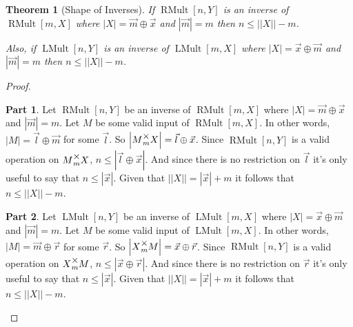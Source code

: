 \documentclass[12pt]{book}
\theoremstyle{plain}
\newtheorem{theorem}{Theorem}[chapter]
\theoremstyle{definition}
\theoremstyle{ppart}
\newtheorem{ppart}{Part}
\theoremstyle{case}
\theoremstyle{solution}
\DeclareMathOperator{\RMult}{RMult}
\DeclareMathOperator{\LMult}{LMult}
\newcommand{\mmult}[1]{\text{\raisebox{1ex}{$\underset{#1}{\times}$}}}
\newcommand{\shape}[1]{\left|#1\right|}
\begin{document}
\begin{theorem}[Shape of Inverses]
\label{inverse_shape}
If $\RMult[n,Y]$ is an inverse of $\RMult[m,X]$ where $\shape{X} = \vec{m} \oplus \vec{x}$ and
$\shape{\vec{m}} = m$ then $n \le \shape{\shape{X}}-m$.

Also, if $\LMult[n,Y]$ is an inverse of $\LMult[m,X]$ where $\shape{X} = \vec{x} \oplus \vec{m}$ and
$\shape{\vec{m}} = m$ then $n \le \shape{\shape{X}}-m$.
\end{theorem}
\begin{proof}
\begin{ppart}
Let $\RMult[n,Y]$ be an inverse of $\RMult[m,X]$ where $\shape{X} = \vec{m} \oplus \vec{x}$ and
$\shape{\vec{m}} = m$.
Let $M$ be some valid input of $\RMult[m,X]$.
In other words, $\shape{M} = \vec{l} \oplus \vec{m}$ for some $\vec{l}$.
So $\shape{M \mmult{m} X} = \vec{l} \oplus \vec{x}$.
Since $\RMult[n,Y]$ is a valid operation on $M \mmult{m} X$, $n \le \shape{\vec{l} \oplus \vec{x}}$.
And since there is no restriction on $\vec{l}$ it's only useful to say that $n \le \shape{\vec{x}}$.
Given that $\shape{\shape{X}} = \shape{\vec{x}} + m$ it follows that $n \le \shape{\shape{X}} - m$.
\end{ppart}
\begin{ppart}
Let $\LMult[n,Y]$ be an inverse of $\LMult[m,X]$ where $\shape{X} = \vec{x} \oplus \vec{m}$ and
$\shape{\vec{m}} = m$.
Let $M$ be some valid input of $\LMult[m,X]$.
In other words, $\shape{M} = \vec{m} \oplus \vec{r}$ for some $\vec{r}$.
So $\shape{X \mmult{m} M} = \vec{x} \oplus \vec{r}$.
Since $\RMult[n,Y]$ is a valid operation on $X \mmult{m} M$, $n \le \shape{\vec{x} \oplus \vec{r}}$.
And since there is no restriction on $\vec{r}$ it's only useful to say that $n \le \shape{\vec{x}}$.
Given that $\shape{\shape{X}} = \shape{\vec{x}} + m$ it follows that $n \le \shape{\shape{X}} - m$.
\end{ppart}
\end{proof}
\end{document}
